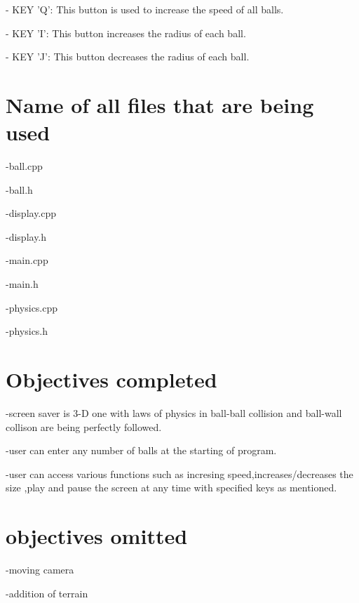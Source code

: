 \documentclass[]{article}
\begin{document}
-	KEY 'Q': This button is used to increase the speed of all balls. 

-	KEY 'I': This button increases the radius of each ball.   

-	KEY 'J': This button decreases the radius of each ball. 

\section{Name of all files that are being used}

-ball.cpp

-ball.h

-display.cpp

-display.h

-main.cpp

-main.h

-physics.cpp

-physics.h
 
\section{Objectives completed}

-screen saver is 3-D one with laws of physics in ball-ball collision and ball-wall collison are being perfectly followed.

-user can enter any number of balls at the starting of program.

-user can access various functions such as incresing speed,increases/decreases the size ,play and pause the screen at any time with specified keys as mentioned.

\section{objectives omitted}

-moving camera

-addition of terrain


	
\end{document}
